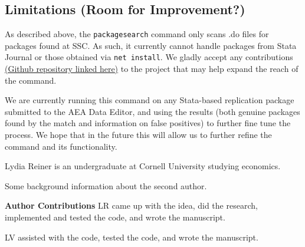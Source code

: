 \subsection{Limitations (Room for Improvement?)}

As described above, the \texttt{packagesearch} command only scans .do files for packages found at SSC. As such, it currently cannot handle packages from Stata Journal or those obtained via \texttt{net install}. 
We gladly accept any contributions \href{https://github.com/lydreiner/Statapackagesearch}{(Github repository linked here)} to the project that may help expand the reach of the command.

We are currently running this command on any Stata-based replication package submitted to the AEA Data Editor, and using the results (both genuine packages found by the match and information on false positives) to further fine tune the process. We hope that in the future this will allow us to further refine the command and its functionality.  










\begin{aboutauthors}
Lydia Reiner is an undergraduate at Cornell University studying economics.

Some background information about the second author.

\textbf{Author Contributions}
LR came up with the idea, did the research, implemented and tested the code, and wrote the manuscript.

LV assisted with the code, tested the code, and wrote the manuscript.
\end{aboutauthors}

